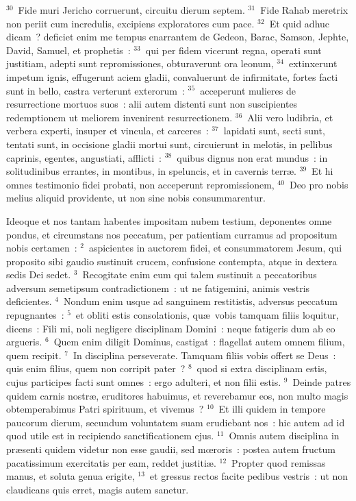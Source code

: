 ${}^{30}$~Fide muri Jericho corruerunt, circuitu dierum septem.
${}^{31}$~Fide Rahab meretrix non periit cum incredulis, excipiens exploratores cum pace.
${}^{32}$~Et quid adhuc dicam~? deficiet enim me tempus enarrantem de Gedeon, Barac, Samson, Jephte, David, Samuel, et prophetis~:
${}^{33}$~qui per fidem vicerunt regna, operati sunt justitiam, adepti sunt repromissiones, obturaverunt ora leonum,
${}^{34}$~extinxerunt impetum ignis, effugerunt aciem gladii, convaluerunt de infirmitate, fortes facti sunt in bello, castra verterunt exterorum~:
${}^{35}$~acceperunt mulieres de resurrectione mortuos suos~: alii autem distenti sunt non suscipientes redemptionem ut meliorem invenirent resurrectionem.
${}^{36}$~Alii vero ludibria, et verbera experti, insuper et vincula, et carceres~:
${}^{37}$~lapidati sunt, secti sunt, tentati sunt, in occisione gladii mortui sunt, circuierunt in melotis, in pellibus caprinis, egentes, angustiati, afflicti~:
${}^{38}$~quibus dignus non erat mundus~: in solitudinibus errantes, in montibus, in speluncis, et in cavernis terr\ae .
${}^{39}$~Et hi omnes testimonio fidei probati, non acceperunt repromissionem,
${}^{40}$~Deo pro nobis melius aliquid providente, ut non sine nobis consummarentur.

\bchapter
\lettrine[lines=3,image=true,loversize=0.05,lraise=-0.03]{I}{}deoque et nos tantam habentes impositam nubem testium, deponentes omne pondus, et circumstans nos peccatum, per patientiam curramus ad propositum nobis certamen~:
${}^{2}$~aspicientes in auctorem fidei, et consummatorem Jesum, qui proposito sibi gaudio sustinuit crucem, confusione contempta, atque in dextera sedis Dei sedet.
${}^{3}$~Recogitate enim eum qui talem sustinuit a peccatoribus adversum semetipsum contradictionem~: ut ne fatigemini, animis vestris deficientes.
${}^{4}$~Nondum enim usque ad sanguinem restitistis, adversus peccatum repugnantes~:
${}^{5}$~et obliti estis consolationis, qu\ae\ vobis tamquam filiis loquitur, dicens~: Fili mi, noli negligere disciplinam Domini~: neque fatigeris dum ab eo argueris.
${}^{6}$~Quem enim diligit Dominus, castigat~: flagellat autem omnem filium, quem recipit.
${}^{7}$~In disciplina perseverate. Tamquam filiis vobis offert se Deus~: quis enim filius, quem non corripit pater~?
${}^{8}$~quod si extra disciplinam estis, cujus participes facti sunt omnes~: ergo adulteri, et non filii estis.
${}^{9}$~Deinde patres quidem carnis nostr\ae , eruditores habuimus, et reverebamur eos, non multo magis obtemperabimus Patri spirituum, et vivemus~?
${}^{10}$~Et illi quidem in tempore paucorum dierum, secundum voluntatem suam erudiebant nos~: hic autem ad id quod utile est in recipiendo sanctificationem ejus.
${}^{11}$~Omnis autem disciplina in pr\ae senti quidem videtur non esse gaudii, sed mœroris~: postea autem fructum pacatissimum exercitatis per eam, reddet justiti\ae .
${}^{12}$~Propter quod remissas manus, et soluta genua erigite,
${}^{13}$~et gressus rectos facite pedibus vestris~: ut non claudicans quis erret, magis autem sanetur.


